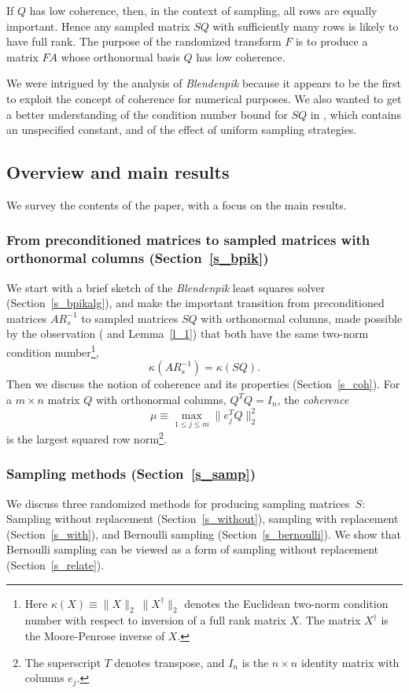 \documentclass{siamltex}
\begin{document}
If $Q$ has low coherence, then, in the context of sampling, all rows
are equally important. Hence any sampled matrix $SQ$ with sufficiently
many rows is likely to have full rank. The purpose of the randomized
transform $F$ is to produce a matrix $FA$ whose orthonormal basis $Q$
has low coherence.

We were intrigued by the analysis of \textsl{Blendenpik} because 
it appears to be the first to exploit the concept of coherence for numerical 
purposes. We  also wanted to get a better understanding of 
the condition number bound for $SQ$ in
\cite[Theorem 3.2]{AMTol10}, which contains an unspecified constant,
and of the effect of uniform sampling strategies.

\subsection{Overview and main results}
We survey the contents of the paper, with a focus on the main results.

\subsubsection*{From preconditioned matrices to sampled matrices with 
orthonormal columns (Section~\ref{s_bpik})}
We start with a brief sketch of the
\textsl{Blendenpik} least squares solver (Section~\ref{s_bpikalg}), and
make the important transition from preconditioned matrices $AR_s^{-1}$
to sampled matrices $SQ$ with orthonormal columns, made possible by
the observation (\cite{AMTol10,RokT08} and Lemma~\ref{l_1}) that both 
have the same two-norm condition 
number\footnote{Here $\kappa(X)\equiv \|X\|_2\>\|X^{\dagger}\|_2$ denotes the 
Euclidean two-norm 
condition number with respect to inversion of a full rank matrix $X$.
The matrix $X^{\dagger}$ is the Moore-Penrose inverse of $X$.},
$$\kappa(AR_s^{-1})=\kappa(SQ).$$
Then we discuss the notion of coherence and its properties 
(Section~\ref{s_coh}). For a $m\times n$ matrix $Q$ with orthonormal 
columns, $Q^TQ=I_n$, the \textit{coherence} 
$$\mu\equiv\max_{1\leq j\leq m}{\|e_j^TQ\|_2^2}$$
is the largest squared row norm\footnote{The superscript $T$ denotes transpose,
and $I_n$ is the $n\times n$ identity matrix with columns $e_j$.}.

\subsubsection*{Sampling methods (Section~\ref{s_samp})}
We discuss three randomized methods for producing sampling matrices~$S$: 
Sampling without replacement (Section~\ref{s_without}), sampling
with replacement (Section~\ref{s_with}), and Bernoulli sampling
(Section~\ref{s_bernoulli}).  We show that Bernoulli sampling can be
viewed as a form of sampling without replacement (Section~\ref{s_relate}).
\end{document}
